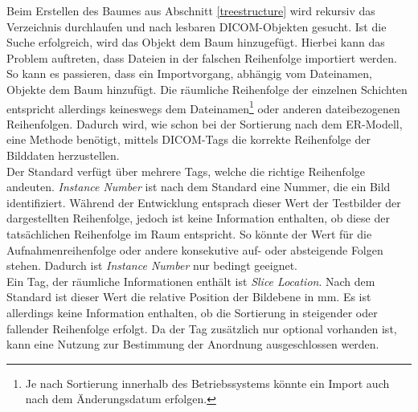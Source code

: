 Beim Erstellen des Baumes aus Abschnitt \ref{treestructure} wird rekursiv das Verzeichnis durchlaufen und nach lesbaren DICOM-Objekten gesucht. Ist die Suche erfolgreich, wird das Objekt dem Baum hinzugefügt. Hierbei kann das Problem auftreten, dass Dateien in der falschen Reihenfolge importiert werden. So kann es passieren, dass ein Importvorgang, abhängig vom Dateinamen, Objekte dem Baum hinzufügt. Die räumliche Reihenfolge der einzelnen Schichten entspricht allerdings keineswegs dem Dateinamen\footnote{Je nach Sortierung innerhalb des Betriebssystems könnte ein Import auch nach dem Änderungsdatum erfolgen.} oder anderen dateibezogenen Reihenfolgen. Dadurch wird, wie schon bei der Sortierung nach dem ER-Modell, eine Methode benötigt, mittels DICOM-Tags die korrekte Reihenfolge der Bilddaten herzustellen.\\
Der Standard verfügt über mehrere Tags, welche die richtige Reihenfolge andeuten. \textit{Instance Number} ist nach dem Standard \cite[C.7.6.1]{dicom:iod} eine Nummer, die ein Bild identifiziert. Während der Entwicklung entsprach dieser Wert der Testbilder der dargestellten Reihenfolge, jedoch ist keine Information enthalten, ob diese der tatsächlichen Reihenfolge im Raum entspricht. So könnte der Wert für die Aufnahmenreihenfolge oder andere konsekutive auf- oder absteigende Folgen stehen. Dadurch ist \textit{Instance Number} nur bedingt geeignet.\\
Ein Tag, der räumliche Informationen enthält ist \textit{Slice Location}. Nach dem Standard \cite[C.7.6.2]{dicom:iod} ist dieser Wert die relative Position der Bildebene in mm. Es ist allerdings keine Information enthalten, ob die Sortierung in steigender oder fallender Reihenfolge erfolgt. Da der Tag zusätzlich nur optional vorhanden ist, kann eine Nutzung zur Bestimmung der Anordnung ausgeschlossen werden.

